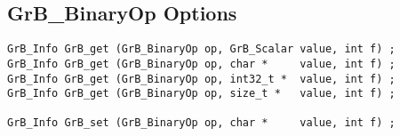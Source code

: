 
\newpage
\subsection{{\sf GrB\_BinaryOp} Options}
\label{get_set_binop}

\begin{mdframed}[userdefinedwidth=6in]
{\footnotesize
\begin{verbatim}
GrB_Info GrB_get (GrB_BinaryOp op, GrB_Scalar value, int f) ;
GrB_Info GrB_get (GrB_BinaryOp op, char *     value, int f) ;
GrB_Info GrB_get (GrB_BinaryOp op, int32_t *  value, int f) ;
GrB_Info GrB_get (GrB_BinaryOp op, size_t *   value, int f) ;

GrB_Info GrB_set (GrB_BinaryOp op, char *     value, int f) ;
\end{verbatim}
}\end{mdframed}

